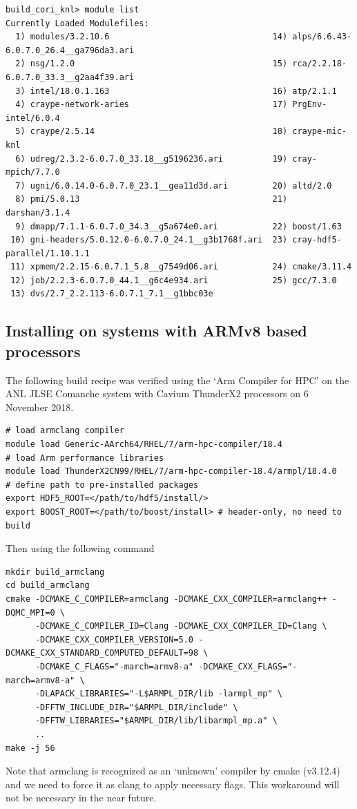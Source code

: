 \verbatimfont{\footnotesize}
\begin{verbatim}
build_cori_knl> module list
Currently Loaded Modulefiles:
  1) modules/3.2.10.6                                 14) alps/6.6.43-6.0.7.0_26.4__ga796da3.ari
  2) nsg/1.2.0                                        15) rca/2.2.18-6.0.7.0_33.3__g2aa4f39.ari
  3) intel/18.0.1.163                                 16) atp/2.1.1
  4) craype-network-aries                             17) PrgEnv-intel/6.0.4
  5) craype/2.5.14                                    18) craype-mic-knl
  6) udreg/2.3.2-6.0.7.0_33.18__g5196236.ari          19) cray-mpich/7.7.0
  7) ugni/6.0.14.0-6.0.7.0_23.1__gea11d3d.ari         20) altd/2.0
  8) pmi/5.0.13                                       21) darshan/3.1.4
  9) dmapp/7.1.1-6.0.7.0_34.3__g5a674e0.ari           22) boost/1.63
 10) gni-headers/5.0.12.0-6.0.7.0_24.1__g3b1768f.ari  23) cray-hdf5-parallel/1.10.1.1
 11) xpmem/2.2.15-6.0.7.1_5.8__g7549d06.ari           24) cmake/3.11.4
 12) job/2.2.3-6.0.7.0_44.1__g6c4e934.ari             25) gcc/7.3.0
 13) dvs/2.7_2.2.113-6.0.7.1_7.1__g1bbc03e

\end{verbatim}

\subsection{Installing on systems with ARMv8 based processors}
The following build recipe was verified using the `Arm Compiler for HPC' on the ANL JLSE Comanche system with Cavium ThunderX2 processors on 6 November 2018.
\begin{verbatim}
# load armclang compiler
module load Generic-AArch64/RHEL/7/arm-hpc-compiler/18.4
# load Arm performance libraries
module load ThunderX2CN99/RHEL/7/arm-hpc-compiler-18.4/armpl/18.4.0
# define path to pre-installed packages
export HDF5_ROOT=</path/to/hdf5/install/>
export BOOST_ROOT=</path/to/boost/install> # header-only, no need to build
\end{verbatim}
Then using the following command
\begin{verbatim}
mkdir build_armclang
cd build_armclang
cmake -DCMAKE_C_COMPILER=armclang -DCMAKE_CXX_COMPILER=armclang++ -DQMC_MPI=0 \
      -DCMAKE_C_COMPILER_ID=Clang -DCMAKE_CXX_COMPILER_ID=Clang \
      -DCMAKE_CXX_COMPILER_VERSION=5.0 -DCMAKE_CXX_STANDARD_COMPUTED_DEFAULT=98 \
      -DCMAKE_C_FLAGS="-march=armv8-a" -DCMAKE_CXX_FLAGS="-march=armv8-a" \
      -DLAPACK_LIBRARIES="-L$ARMPL_DIR/lib -larmpl_mp" \
      -DFFTW_INCLUDE_DIR="$ARMPL_DIR/include" \
      -DFFTW_LIBRARIES="$ARMPL_DIR/lib/libarmpl_mp.a" \
      ..
make -j 56
\end{verbatim}
Note that armclang is recognized as an `unknown' compiler by cmake (v3.12.4) and we need to force it as clang to apply necessary flags.
This workaround will not be necessary in the near future.

